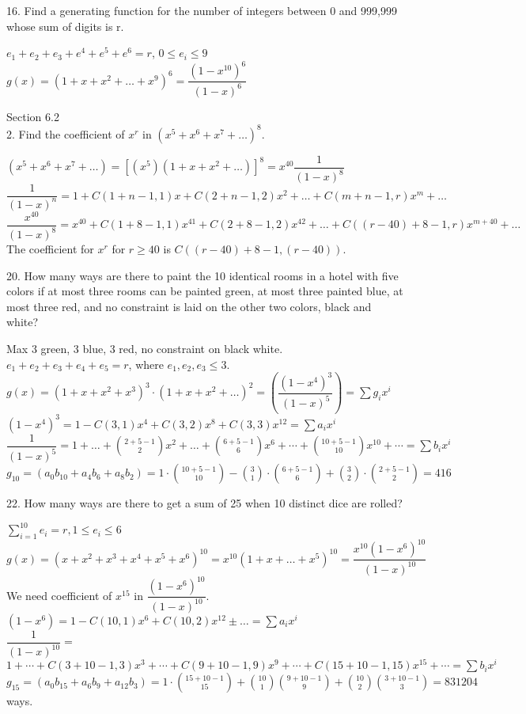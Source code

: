 \documentclass[12pt]{article}
\begin{document}
16. Find a generating function for the number of integers between 
0 and 999,999 whose sum of digits is r.
\begin{solution}
    $e_1 + e_2 + e_3 + e^4 + e^5 + e^6 = r$, $0\le e_i\le9$\\
    $g(x)=(1+x+x^2+\dots+x^9)^6 = \dfrac{(1-x^{10})^6}{(1-x)^6}$
\end{solution}
Section 6.2\\
2. Find the coefficient of $x^r$ in $(x^5 + x^6 + x^7 +\dots)^8$.
\begin{solution}
    $(x^5 +x^6 + x^7 +\dots) = [(x^5)(1+x+x^2+\dots)]^8
    =x^{40}\dfrac{1}{(1-x)^8}$\\
    $\dfrac{1}{(1-x)^n}= 1+C(1+n-1,1)x+C(2+n-1,2)x^2 +\dots + 
    C(m+n-1,r)x^m + \dots$\\
    $\dfrac{x^{40}}{(1-x)^8}= x^{40}+C(1+8-1,1)x^{41}+
    C(2+8-1,2)x^{42} +\dots + C((r-40)+8-1,r)x^{m+40} + \dots$\\
    The coefficient for $x^r$ for $r\ge 40$ is $C((r-40)+8-1,(r-40))$.
\end{solution}
20. How many ways are there to paint the 10 identical rooms in a 
hotel with five colors if at most three rooms can be painted green, 
at most three painted blue, at most three red, and no constraint 
is laid on the other two colors, black and white?
\begin{solution}
    Max 3 green, 3 blue, 3 red, no constraint on black white. \\
    $e_1 + e_2 + e_3 + e_4 + e_5 = r$, where $e_1, e_2, e_3 \le 3$.\\
    $g(x)= (1+x+x^2+x^3)^3 \cdot (1+x+x^2+\dots)^2 =
    \left(\dfrac{(1-x^4)^3}{(1-x)^5}\right) = \sum g_ix^i$\\
    $(1-x^4)^3 = 1-C(3,1)x^4 + C(3, 2)x^8 + C(3, 3)x^{12}=\sum a_i x^i$\\
    $\dfrac{1}{(1-x)^5} = 
    1+\dots+
    \binom{2+5-1}{2}x^2+\dots+
    \binom{6+5-1}{6}x^6+\cdots + 
    \binom{10+5-1}{10}x^{10}+\cdots=\sum b_i x^i$\\
    $g_{10} = (a_0b_{10} + a_4b_6+a_8b_2) = 
    1\cdot \binom{10+5-1}{10}-
    \binom{3}{1}\cdot\binom{6+5-1}{6}+
    \binom{3}{2}\cdot\binom{2+5-1}{2} = 416$
\end{solution}
22. How many ways are there to get a sum of 25 when 10 distinct 
dice are rolled?
\begin{solution}
    $\sum_{i=1}^{10} e_i = r, 1 \le e_i\le 6$\\
    $g(x) = (x+x^2+x^3+x^4+x^5+x^6)^{10}=x^{10}(1+x+\dots+x^5)^{10} = 
    \dfrac{x^{10}(1-x^6)^{10}}{(1-x)^{10}}$\\
    We need coefficient of $x^{15}$ in $\dfrac{(1-x^6)^{10}}{(1-x)^{10}}$. \\
    $(1-x^6) = 1 - C(10, 1)x^6 + C(10, 2)x^{12} \pm\dots = \sum a_ix^i$\\
    $\dfrac{1}{(1-x)^{10}} = $\\
    $1+\cdots+ 
    C(3+10-1,3)x^3 + \cdots +
    C(9+10-1,9)x^9 + \cdots +
    C(15+10-1, 15)x^{15} +\cdots = \sum b_ix^i$\\
    ${g_15} = (a_0 b_{15} + a_6 b_9 + a_{12}b_3) = 
    1\cdot\binom{15+10-1}{15} +
    \binom{10}{1}\binom{9+10-1}{9} + 
    \binom{10}{2}\binom{3+10-1}{3} = 831204$ ways. 
\end{solution}
\end{document}
